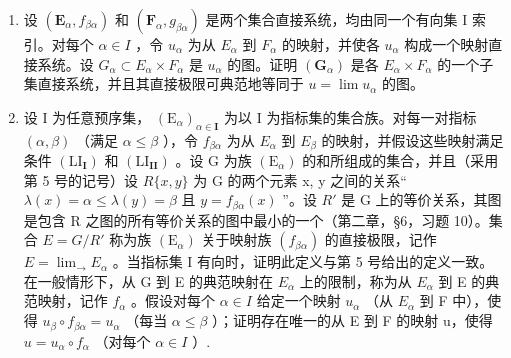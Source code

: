 \begin{enumerate}
\def\labelenumi{\arabic{enumi}.}
\setcounter{enumi}{7}
\item
  设 \((\mathbf{E}_{\alpha}, f_{\beta\alpha})\) 和 \((\mathbf{F}_{\alpha}, g_{\beta\alpha})\) 是两个集合直接系统，均由同一个有向集 I 索引。对每个 \(\alpha \in I\) ，令 \(u_{\alpha}\) 为从 \(E_{\alpha}\) 到 \(F_{\alpha}\) 的映射，并使各 \(u_{\alpha}\) 构成一个映射直接系统。设 \(G_{\alpha} \subset E_{\alpha} \times F_{\alpha}\) 是 \(u_{\alpha}\) 的图。证明 \((\mathbf{G}_{\alpha})\) 是各 \(E_{\alpha} \times F_{\alpha}\) 的一个子集直接系统，并且其直接极限可典范地等同于 \(u = \lim u_{\alpha}\) 的图。
\item
  设 I 为任意预序集， \((\mathrm{E}_{\alpha})_{\alpha\in\mathbf{I}}\) 为以 I 为指标集的集合族。对每一对指标 \((\alpha,\beta)\) （满足 \(\alpha\leqslant\beta\) ），令 \(f_{\beta\alpha}\) 为从 \(E_{\alpha}\) 到 \(E_{\beta}\) 的映射，并假设这些映射满足条件 \((\mathrm{LI}_{\mathbf{I}})\) 和 \((\mathrm{LI}_{\mathbf{II}})\) 。设 G 为族 \((\mathrm{E}_{\alpha})\) 的和所组成的集合，并且（采用第 5 号的记号）设 \(R\{x,y\}\) 为 G 的两个元素 x, y 之间的关系“ \(\lambda(x)=\alpha\leqslant\lambda(y)=\beta\) 且 \(y=f_{\beta\alpha}(x)\) ”。设 \(R'\) 是 G 上的等价关系，其图是包含 R 之图的所有等价关系的图中最小的一个（第二章，§6，习题 10）。集合 \(E=G/R'\) 称为族 \((\mathrm{E}_{\alpha})\) 关于映射族 \((f_{\beta\alpha})\) 的直接极限，记作 \(E=\lim_{\rightarrow}E_{\alpha}\) 。当指标集 I 有向时，证明此定义与第 5 号给出的定义一致。在一般情形下，从 G 到 E 的典范映射在 \(E_{\alpha}\) 上的限制，称为从 \(E_{\alpha}\) 到 E 的典范映射，记作 \(f_{\alpha}\) 。假设对每个 \(\alpha\in I\) 给定一个映射 \(u_{\alpha}\) （从 \(E_{\alpha}\) 到 F 中），使得 \(u_{\beta}\circ f_{\beta\alpha}=u_{\alpha}\) （每当 \(\alpha\leqslant\beta\) ）；证明存在唯一的从 E 到 F 的映射 u，使得 \(u=u_{\alpha}\circ f_{\alpha}\) （对每个 \(\alpha\in I\) ）.
\end{enumerate}

